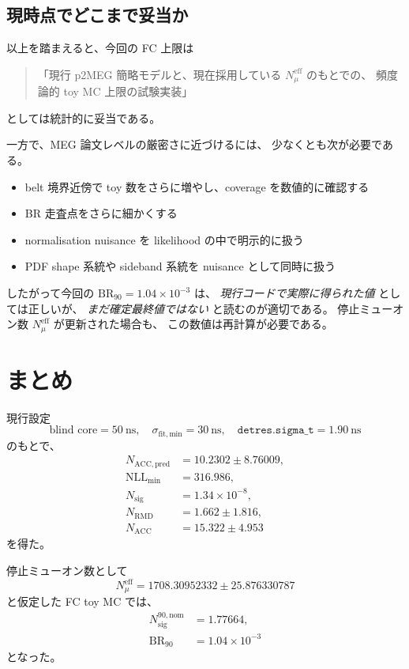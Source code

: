 \documentclass[a4paper,11pt]{jsarticle}
\begin{document}
\subsection{現時点でどこまで妥当か}
以上を踏まえると、今回の FC 上限は
\begin{quote}
「現行 p2MEG 簡略モデルと、現在採用している \(N_\mu^{\mathrm{eff}}\) のもとでの、
頻度論的 toy MC 上限の試験実装」
\end{quote}
としては統計的に妥当である。

一方で、MEG 論文レベルの厳密さに近づけるには、
少なくとも次が必要である。
\begin{itemize}
  \item belt 境界近傍で toy 数をさらに増やし、coverage を数値的に確認する
  \item BR 走査点をさらに細かくする
  \item normalisation nuisance を likelihood の中で明示的に扱う
  \item PDF shape 系統や sideband 系統を nuisance として同時に扱う
\end{itemize}

したがって今回の \(\mathrm{BR}_{90}=1.04\times10^{-3}\) は、
\emph{現行コードで実際に得られた値} としては正しいが、
\emph{まだ確定最終値ではない} と読むのが適切である。
停止ミューオン数 \(N_{\mu}^{\mathrm{eff}}\) が更新された場合も、
この数値は再計算が必要である。

\section{まとめ}
現行設定
\[
\text{blind core}=50\ \mathrm{ns},\quad
\sigma_{\mathrm{fit,min}}=30\ \mathrm{ns},\quad
\texttt{detres.sigma\_t}=1.90\ \mathrm{ns}
\]
のもとで、
\begin{align}
N_{\mathrm{ACC,pred}} &= 10.2302 \pm 8.76009,\\
\mathrm{NLL}_{\min} &= 316.986,\\
N_{\mathrm{sig}} &= 1.34\times 10^{-8},\\
N_{\mathrm{RMD}} &= 1.662 \pm 1.816,\\
N_{\mathrm{ACC}} &= 15.322 \pm 4.953
\end{align}
を得た。

停止ミューオン数として
\[
N_{\mu}^{\mathrm{eff}} = 1708.30952332 \pm 25.876330787
\]
と仮定した FC toy MC では、
\begin{align}
N_{\mathrm{sig}}^{90,\mathrm{nom}} &= 1.77664,\\
\mathrm{BR}_{90} &= 1.04\times 10^{-3}
\end{align}
となった。
\end{document}
